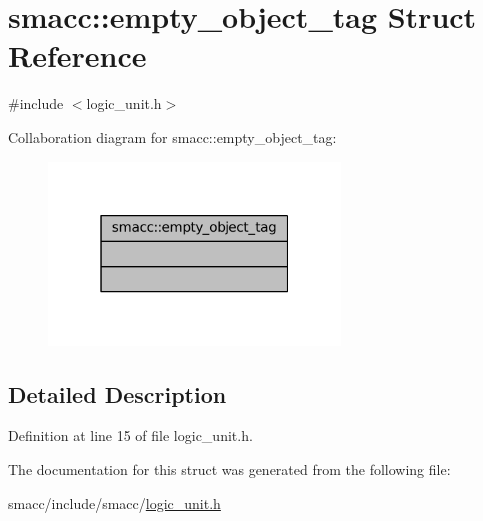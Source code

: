 \hypertarget{structsmacc_1_1empty__object__tag}{}\section{smacc\+:\+:empty\+\_\+object\+\_\+tag Struct Reference}
\label{structsmacc_1_1empty__object__tag}


{\ttfamily \#include $<$logic\+\_\+unit.\+h$>$}



Collaboration diagram for smacc\+:\+:empty\+\_\+object\+\_\+tag\+:
\nopagebreak
\begin{figure}[H]
\begin{center}
\leavevmode
\includegraphics[width=220pt]{structsmacc_1_1empty__object__tag__coll__graph}
\end{center}
\end{figure}


\subsection{Detailed Description}


Definition at line 15 of file logic\+\_\+unit.\+h.



The documentation for this struct was generated from the following file\+:\begin{DoxyCompactItemize}
\item 
smacc/include/smacc/\hyperlink{logic__unit_8h}{logic\+\_\+unit.\+h}\end{DoxyCompactItemize}

